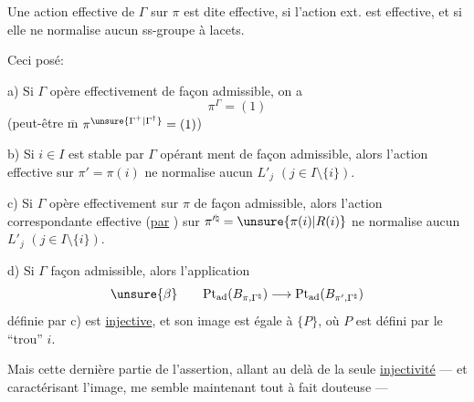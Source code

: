 Une action effective de $\Gamma$ sur $\pi$ est dite effective,  si l'action ext. est effective, et si elle ne normalise aucun ss-groupe à lacets.

Ceci posé:

a) Si $\Gamma$ opère effectivement de façon admissible, on a
\[
\pi^\Gamma=(1)
\]
(peut-être $\overline{\mathrm m}$ $\pi^{\unsure{\Gamma^+|\Gamma^\dagger}}=(1)$) 






b) Si $i\in I$ est stable par $\Gamma$ opérant ment de façon admissible, alors l'action effective sur $\pi'=\pi(i)$ ne normalise aucun $L'_j$ $(j\in I\setminus\{i\})$.

c) Si $\Gamma$ opère effectivement sur $\pi$ de façon admissible,  alors l'action correspondante effective (\uline{par} ) sur $\pi^{\prime\natural}=\unsure{\pi(i)|R(i)}$ ne normalise aucun $L'_j$ $(j\in I\setminus\{i\})$.

d) Si $\Gamma$  façon admissible, alors l'application
\[
\unsure{\beta}\qquad
\mathrm{Pt}_{\mathrm{ad}}(B_{\pi,\Gamma^{\natural}})\longrightarrow
\mathrm{Pt}_{\mathrm{ad}}(B_{\pi',\Gamma^{\natural}})
\]
définie par c) est \uline{injective}, et  son image est  égale à $\{P\}$, où $P$ est défini par le ``trou'' $i$.

Mais cette dernière partie de l'assertion, allant au delà de la seule \uline{injectivité} --- et caractérisant l'image, me semble maintenant tout à fait douteuse ---


